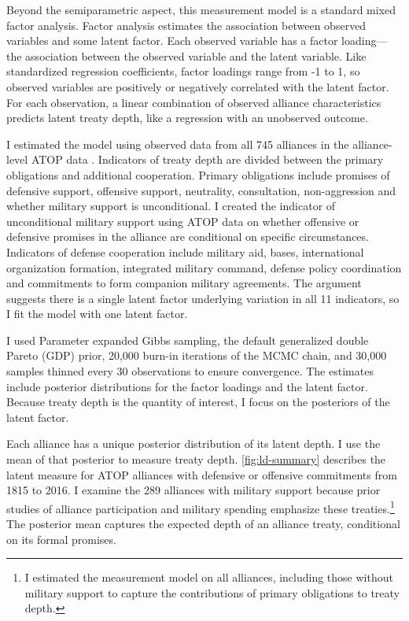 \documentclass[12pt]{article}
\begin{document}
Beyond the semiparametric aspect, this measurement model is a standard mixed factor analysis.
Factor analysis estimates the association between observed variables and some latent factor.
Each observed variable has a factor loading--- the association between the observed variable and the latent variable.  
Like standardized regression coefficients, factor loadings range from -1 to 1, so observed variables are positively or negatively correlated with the latent factor.  
For each observation, a linear combination of observed alliance characteristics predicts latent treaty depth, like a regression with an unobserved outcome.  


I estimated the model using observed data from all 745 alliances in the alliance-level ATOP data \citep{Leedsetal2002}. 
Indicators of treaty depth are divided between the primary obligations and additional cooperation.
Primary obligations include promises of defensive support, offensive support, neutrality, consultation, non-aggression and whether military support is unconditional. 
I created the indicator of unconditional military support using ATOP data on whether offensive or defensive promises in the alliance are conditional on specific circumstances. 
Indicators of defense cooperation include military aid, bases, international organization formation, integrated military command, defense policy coordination and commitments to form companion military agreements. 
The argument suggests there is a single latent factor underlying variation in all 11 indicators, so I fit the model with one latent factor. 


I used Parameter expanded Gibbs sampling, the default generalized double Pareto (GDP) prior, 20,000 burn-in iterations of the MCMC chain, and 30,000 samples thinned every 30 observations to ensure convergence. 
The estimates include posterior distributions for the factor loadings and the latent factor. 
Because treaty depth is the quantity of interest, I focus on the posteriors of the latent factor. 


Each alliance has a unique posterior distribution of its latent depth. 
I use the mean of that posterior to measure treaty depth. 
\autoref{fig:ld-summary} describes the latent measure for ATOP alliances with defensive or offensive commitments from 1815 to 2016.
I examine the 289 alliances with military support because prior studies of alliance participation and military spending emphasize these treaties.\footnote{
I estimated the measurement model on all alliances, including those without military support to capture the contributions of primary obligations to treaty depth.}
The posterior mean captures the expected depth of an alliance treaty, conditional on its formal promises. 
\end{document}

